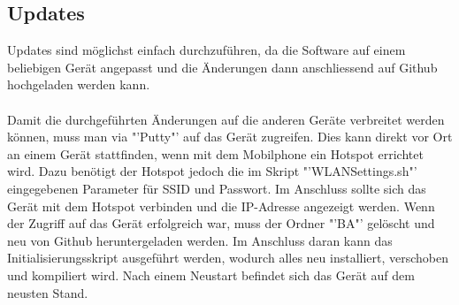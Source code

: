 \subsection{Updates}
Updates sind möglichst einfach durchzuführen, da die Software auf einem beliebigen Gerät angepasst und die Änderungen dann anschliessend auf Github hochgeladen werden kann. \\\\
Damit die durchgeführten Änderungen auf die anderen Geräte verbreitet werden können, muss man via "'Putty"' auf das Gerät zugreifen. Dies kann direkt vor Ort an einem Gerät stattfinden, wenn mit dem Mobilphone ein Hotspot errichtet wird. Dazu benötigt der Hotspot jedoch die im Skript "'WLANSettings.sh"' eingegebenen Parameter für SSID und Passwort. Im Anschluss sollte sich das Gerät mit dem Hotspot verbinden und die IP-Adresse angezeigt werden. Wenn der Zugriff auf das Gerät erfolgreich war, muss der Ordner "'BA"' gelöscht und neu von Github heruntergeladen werden. Im Anschluss daran kann das Initialisierungsskript ausgeführt werden, wodurch alles neu installiert, verschoben und kompiliert wird. Nach einem Neustart befindet sich das Gerät auf dem neusten Stand.